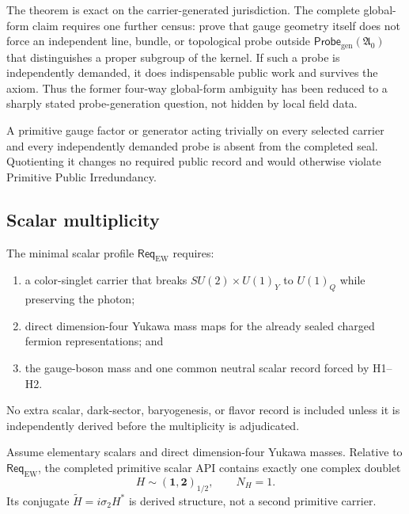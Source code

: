 \begin{remark}
The theorem is exact on the carrier-generated jurisdiction.  The complete global-form
claim requires one further census: prove that gauge geometry itself does not force an
independent line, bundle, or topological probe outside
\(\mathsf{Probe}_{\mathrm{gen}}(\mathfrak A_0)\) that distinguishes a proper subgroup
of the kernel.  If such a probe is independently demanded, it does indispensable
public work and survives the axiom.  Thus the former four-way global-form ambiguity
has been reduced to a sharply stated probe-generation question, not hidden by local
field data.
\end{remark}

\begin{corollary}
A primitive gauge factor or generator acting trivially on every selected carrier and
every independently demanded probe is absent from the completed seal.  Quotienting
it changes no required public record and would otherwise violate Primitive Public
Irredundancy.
\end{corollary}

\subsection{Scalar multiplicity}

\begin{definition}
The minimal scalar profile \(\mathsf{Req}_{\mathrm{EW}}\) requires:
\begin{enumerate}[label=\textup{H\arabic*},leftmargin=2.4em]
\item a color-singlet carrier that breaks
      \(SU(2)\times U(1)_Y\) to \(U(1)_Q\) while preserving the photon;
\item direct dimension-four Yukawa mass maps for the already sealed charged
      fermion representations; and
\item the gauge-boson mass and one common neutral scalar record forced by H1--H2.
\end{enumerate}
No extra scalar, dark-sector, baryogenesis, or flavor record is included unless it is
independently derived before the multiplicity is adjudicated.
\end{definition}

\begin{theorem}
\label{thm:ppi-one-higgs}
Assume elementary scalars and direct dimension-four Yukawa masses.  Relative to
\(\mathsf{Req}_{\mathrm{EW}}\), the completed primitive scalar API contains exactly
one complex doublet
\[
 \boxed{H\sim(\mathbf1,\mathbf2)_{1/2},\qquad N_H=1.}
\]
Its conjugate \(\widetilde H=i\sigma_2H^*\) is derived structure, not a second
primitive carrier.
\end{theorem}

